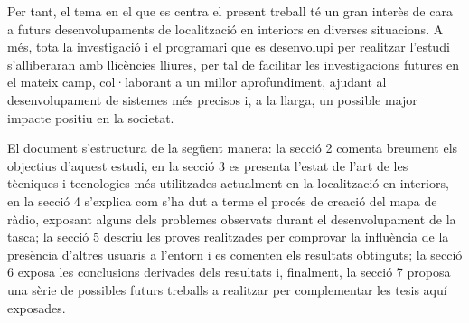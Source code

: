 Per tant, el tema en el que es centra el present treball té un gran interès de cara a futurs desenvolupaments de localització en interiors en diverses situacions. A més, tota la investigació i el programari que es desenvolupi per realitzar l’estudi s’alliberaran amb llicències lliures, per tal de facilitar les investigacions futures en el mateix camp, col·laborant a un millor aprofundiment, ajudant al desenvolupament de sistemes més precisos i, a la llarga, un possible major impacte positiu en la societat.

El document s'estructura de la següent manera: la secció 2 comenta breument els objectius d'aquest estudi, en la secció 3 es presenta l'estat de l'art de les tècniques i tecnologies més utilitzades actualment en la localització en interiors, en la secció 4 s'explica com s'ha dut a terme el procés de creació del mapa de ràdio, exposant alguns dels problemes observats durant el desenvolupament de la tasca; la secció 5 descriu les proves realitzades per comprovar la influència de la presència d'altres usuaris a l'entorn i es comenten els resultats obtinguts; la secció 6 exposa les conclusions derivades dels resultats i, finalment, la secció 7 proposa una sèrie de possibles futurs treballs a realitzar per complementar les tesis aquí exposades.
